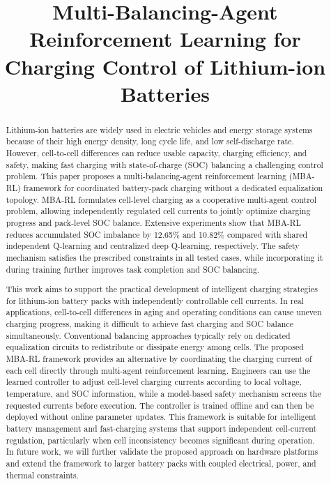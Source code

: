 \documentclass[10pt,journal,letterpaper]{IEEEtran}
\newenvironment{IEEEpractitioners}
  {\renewcommand{\abstractname}{Note to Practitioners}\begin{abstract}}
  {\end{abstract}}
\begin{document}
\title{Multi-Balancing-Agent Reinforcement Learning for Charging Control of Lithium-ion Batteries}


\maketitle
\begin{abstract}
Lithium-ion batteries are widely used in electric vehicles and energy storage systems because of their high energy density, long cycle life, 
and low self-discharge rate. However, cell-to-cell differences can reduce usable capacity, charging efficiency, and safety, making fast charging with state-of-charge (SOC) balancing a challenging control problem. 
This paper proposes a multi-balancing-agent reinforcement learning (MBA-RL) framework for coordinated battery-pack charging without a dedicated equalization topology. 
MBA-RL formulates cell-level charging as a cooperative multi-agent control problem, allowing independently regulated cell currents to jointly optimize charging progress and pack-level SOC balance. 
Extensive experiments show that MBA-RL reduces accumulated SOC imbalance by 12.65\% and 10.82\% compared with shared independent Q-learning and centralized deep Q-learning, respectively. 
The safety mechanism satisfies the prescribed constraints in all tested cases, while incorporating it during training further improves task completion and SOC balancing.
\end{abstract}
\begin{IEEEpractitioners}
This work aims to support the practical development of intelligent charging strategies for lithium-ion battery packs with independently controllable cell currents. In real applications, cell-to-cell differences in aging and operating conditions can cause uneven charging progress, making it difficult to achieve fast charging and SOC balance simultaneously. Conventional balancing approaches typically rely on dedicated equalization circuits to redistribute or dissipate energy among cells. The proposed MBA-RL framework provides an alternative by coordinating the charging current of each cell directly through multi-agent reinforcement learning. Engineers can use the learned controller to adjust cell-level charging currents according to local voltage, temperature, and SOC information, while a model-based safety mechanism screens the requested currents before execution. The controller is trained offline and can then be deployed without online parameter updates. This framework is suitable for intelligent battery management and fast-charging systems that support independent cell-current regulation, particularly when cell inconsistency becomes significant during operation. In future work, we will further validate the proposed approach on hardware platforms and extend the framework to larger battery packs with coupled electrical, power, and thermal constraints.
\end{IEEEpractitioners}
\end{document}
